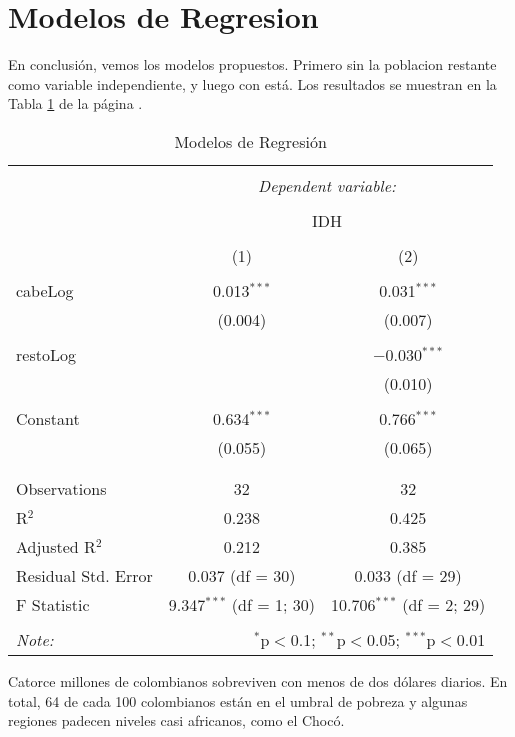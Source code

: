 \section{Modelos de Regresion}\label{regresion}


En conclusión, vemos los modelos propuestos. Primero sin la poblacion restante como variable independiente, y luego con está. Los resultados se muestran en la Tabla \ref{regresiones} de la página \pageref{regresiones}.



\begin{table}[!htbp] \centering 
  \caption{Modelos de Regresión} 
  \label{regresiones} 
\begin{tabular}{@{\extracolsep{5pt}}lcc} 
\\[-1.8ex]\hline 
\hline \\[-1.8ex] 
 & \multicolumn{2}{c}{\textit{Dependent variable:}} \\ 
\cline{2-3} 
\\[-1.8ex] & \multicolumn{2}{c}{IDH} \\ 
\\[-1.8ex] & (1) & (2)\\ 
\hline \\[-1.8ex] 
 cabeLog & 0.013$^{***}$ & 0.031$^{***}$ \\ 
  & (0.004) & (0.007) \\ 
  & & \\ 
 restoLog &  & $-$0.030$^{***}$ \\ 
  &  & (0.010) \\ 
  & & \\ 
 Constant & 0.634$^{***}$ & 0.766$^{***}$ \\ 
  & (0.055) & (0.065) \\ 
  & & \\ 
\hline \\[-1.8ex] 
Observations & 32 & 32 \\ 
R$^{2}$ & 0.238 & 0.425 \\ 
Adjusted R$^{2}$ & 0.212 & 0.385 \\ 
Residual Std. Error & 0.037 (df = 30) & 0.033 (df = 29) \\ 
F Statistic & 9.347$^{***}$ (df = 1; 30) & 10.706$^{***}$ (df = 2; 29) \\ 
\hline 
\hline \\[-1.8ex] 
\textit{Note:}  & \multicolumn{2}{r}{$^{*}$p$<$0.1; $^{**}$p$<$0.05; $^{***}$p$<$0.01} \\ 
\end{tabular} 
\end{table} 
Catorce millones de colombianos sobreviven con menos de dos dólares diarios. En total, 64 de cada 100 colombianos están en el umbral de pobreza y algunas regiones padecen niveles casi africanos, como el Chocó.

